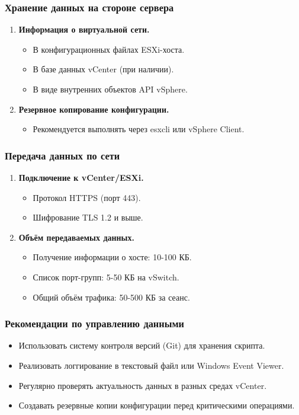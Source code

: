 \subsubsection{Хранение данных на стороне сервера}
\begin{enumerate}
    \item \textbf{Информация о виртуальной сети.}
    \begin{itemize}
        \item В конфигурационных файлах ESXi-хоста.
        \item В базе данных vCenter (при наличии).
        \item В виде внутренних объектов API vSphere.
    \end{itemize}
    
    \item \textbf{Резервное копирование конфигурации.}
    \begin{itemize}
        \item Рекомендуется выполнять через esxcli или vSphere Client.
    \end{itemize}
\end{enumerate}

\subsubsection{Передача данных по сети}
\begin{enumerate}
    \item \textbf{Подключение к vCenter/ESXi.}
    \begin{itemize}
        \item Протокол HTTPS (порт 443).
        \item Шифрование TLS 1.2 и выше.
    \end{itemize}
    
    \item \textbf{Объём передаваемых данных.}
    \begin{itemize}
        \item Получение информации о хосте: 10-100 КБ.
        \item Список порт-групп: 5-50 КБ на vSwitch.
        \item Общий объём трафика: 50-500 КБ за сеанс.
    \end{itemize}
\end{enumerate}

\subsubsection{Рекомендации по управлению данными}
\begin{itemize}
    \item Использовать систему контроля версий (Git) для хранения скрипта.
    \item Реализовать логгирование в текстовый файл или Windows Event Viewer.
    \item Регулярно проверять актуальность данных в разных средах vCenter.
    \item Создавать резервные копии конфигурации перед критическими операциями.
\end{itemize}

